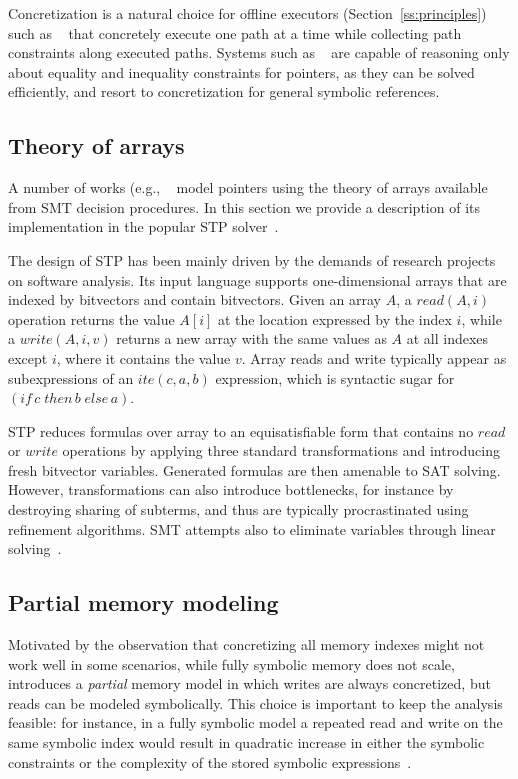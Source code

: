 Concretization is a natural choice for offline executors (Section~\ref{ss:principles}) such as ~\cite{DART-PLDI05,SAGE-NDSS08} that concretely execute one path at a time while collecting path constraints along executed paths. Systems such as ~\cite{CREST-ASE08,CUTE-FSE13} are capable of reasoning only about equality and inequality constraints for pointers, as they can be solved efficiently, and resort to concretization for general symbolic references.



\subsection{Theory of arrays}
\label{ss:theory-arrays}
A number of works (e.g., ~\cite{EXE-CCS06,KLEE-OSDI08,SAGE-NDSS08} model pointers using the theory of arrays available from SMT decision procedures. In this section we provide a description of its implementation in the popular STP solver~\cite{STP-CAV07}.

The design of STP has been mainly driven by the demands of research projects on software analysis. Its input language supports one-dimensional arrays that are indexed by bitvectors and contain bitvectors. Given an array $A$, a $read(A,i)$ operation returns the value $A[i]$ at the location expressed by the index $i$, while a $write(A,i,v)$ returns a new array with the same values as $A$ at all indexes except $i$, where it contains the value $v$. Array reads and write typically appear as subexpressions of an $ite(c,a,b)$ expression, which is syntactic sugar for $(if\,c\;then\,b\;else\,a)$.

STP reduces formulas over array to an equisatisfiable form that contains no $read$ or $write$ operations by applying three standard transformations and introducing fresh bitvector variables. Generated formulas are then amenable to SAT solving. However, transformations can also introduce bottlenecks, for instance by destroying sharing of subterms, and thus are typically procrastinated using refinement algorithms. SMT attempts also to eliminate variables through linear solving~\cite{STP-CAV07}.

\subsection{Partial memory modeling}
\label{ss:index-based-memory}
Motivated by the observation that concretizing all memory indexes might not work well in some scenarios, while fully symbolic memory does not scale, ~\cite{MAYHEM-SP12} introduces a {\em partial} memory model in which writes are always concretized, but reads can be modeled symbolically. This choice is important to keep the analysis feasible: for instance, in a fully symbolic model a repeated read and write on the same symbolic index would result in quadratic increase in either the symbolic constraints or the complexity of the stored symbolic expressions~\cite{DRILLER-NDSS16}.

